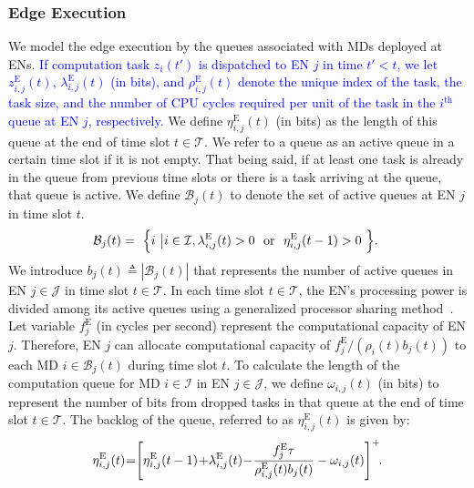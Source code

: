 \documentclass[10pt, journal,letterpaper]{IEEEtran}
\begin{document}
\subsubsection{Edge Execution}
We model the edge execution by the queues associated with MDs deployed at ENs. \textcolor{blue}{If computation task $z_i(t')$ is dispatched to EN $j$ in time $t' < t$, we let $z_{i,j}^{\text{E}}(t)$, $\lambda_{i,j}^{\text{E}}(t)$ (in bits), and $\rho_{i,j}^{\text{E}}(t)$ denote the unique index of the task, the task size, and the number of CPU cycles required per unit of the task in the $i^{\text{th}}$ queue at EN $j$, respectively. } We define $\eta_{i,j}^{\text{E}}(t)$ (in bits) as the length of this queue at the end of time slot $t \in \mathcal{T}$. We refer to a queue as an active queue in a certain time slot if it is not empty. That being said, if at least one task is already in the queue from previous time slots or there is a task arriving at the queue, that queue is active. We define $\mathcal{B}_j(t)$ to denote the set of active queues at EN $j$ in time slot $t$.
\begin{alignat}{1}
	\mathcal{B}_j(t) = \textcolor{white}{i}\Big\{i \textcolor{white}{i}\big| i \in \mathcal{I}, \lambda_{i,j}^{\text{E}}(t)>0\,\, \textcolor{white}{i}\text{or}\textcolor{white}{i} \,\, \eta_{i,j}^{\text{E}}(t-1)>0\textcolor{white}{i}\Big\}.\textcolor{white}{i}
	\label{9}  
\end{alignat}
We introduce $b_j(t) \triangleq |\mathcal{B}_j(t)|$ that represents the number of active queues in EN $j \in \mathcal{J}$ in time slot $t \in \mathcal{T}$. In each time slot $t \in \mathcal{T}$, the EN's processing power is divided among its active queues using a generalized processor sharing method~\cite{parekh1993generalized}. Let variable $f_j^{\text{E}}$ (in cycles per second) represent the computational capacity of EN $j$. Therefore, EN $j$ can allocate computational capacity of $f_j^{\text{E}}/(\rho_i(t) b_j(t))$ to each MD $i \in \mathcal{B}_j(t)$ during time slot $t$. To calculate the length of the computation queue for MD $i \in \mathcal{I}$ in EN $j \in \mathcal{J}$, we define $\omega_{i,j}(t)$ (in bits) to represent the number of bits from dropped tasks in that queue at the end of time slot $t \in \mathcal{T}$. The backlog of the queue, referred to as $\eta_{i,j}^{\text{E}}(t)$ is given by:
\begin{alignat}{1}
	\eta_{i,j}^{\text{E}}(t)\hspace{-0.8mm}=\hspace{-1mm}\left[\eta_{i,j}^{\text{E}}(t-1)\hspace{-0.6mm}+\hspace{-0.7mm}\lambda_{i,j}^{\text{E}}(t)\hspace{-0.7mm}-\hspace{-0.7mm}{f_j^{\text{E}}\tau\over \rho_{i,j}^{\text{E}}(t)b_j(t)} -\omega_{i,j}(t)\right]^+\hspace{-1mm}.
	\label{10}  
\end{alignat}
\end{document}

